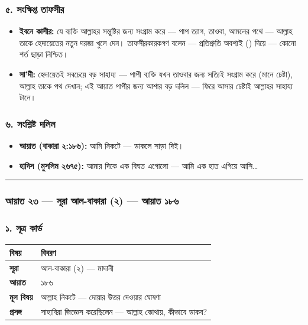 \subsubsection*{৫. সংক্ষিপ্ত তাফসীর}

\begin{itemize}
\item \textbf{ইবনে কাসীর:} যে ব্যক্তি আল্লাহর সন্তুষ্টির জন্য সংগ্রাম করে — পাপ ত্যাগ, তাওবা, আমলের পথে — আল্লাহ তাকে হেদায়েতের নতুন দরজা খুলে দেন। তাফসীরকারকগণ বলেন — প্রতিশ্রুতি অবশ্যই () দিয়ে — কোনো শর্ত ছাড়া নিশ্চিত।
\item \textbf{সা'দী:} হেদায়েতই সবচেয়ে বড় সাহায্য — পাপী ব্যক্তি যখন তাওবার জন্য সত্যিই সংগ্রাম করে (মানে চেষ্টা), আল্লাহ তাকে পথ দেখান; এই আয়াত পাপীর জন্য আশার বড় দলিল — ফিরে আসার চেষ্টাই আল্লাহর সাহায্য টানে।
\end{itemize}
\subsubsection*{৬. সংশ্লিষ্ট দলিল}

\begin{itemize}
\item \textbf{আয়াত (বাকারা ২:১৮৬):} আমি নিকটে — ডাকলে সাড়া দিই।
\item \textbf{হাদিস (মুসলিম ২৬৭৫):} আমার দিকে এক বিঘত এগোলো — আমি এক হাত এগিয়ে আসি…
\end{itemize}
\medskip\hrule\medskip

\subsubsection*{আয়াত ২৩ — সূরা আল-বাকারা (২) — আয়াত ১৮৬}

\subsubsection*{১. সূত্র কার্ড}

\begin{table}[h]\centering\small
\begin{tabular}{ll}
বিষয় & বিবরণ \\
\hline
\textbf{সূরা} & আল-বাকারা (২) — মাদানী \\
\textbf{আয়াত} & ১৮৬ \\
\textbf{মূল বিষয়} & আল্লাহ নিকটে — দোয়ার উত্তর দেওয়ার ঘোষণা \\
\textbf{প্রসঙ্গ} & সাহাবিরা জিজ্ঞেস করেছিলেন — আল্লাহ কোথায়, কীভাবে ডাকব? \\
\hline
\end{tabular}
\end{table}

